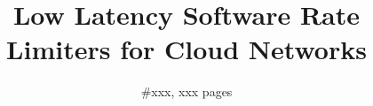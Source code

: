 \documentclass{apnet17}
\begin{document}
\def\draft{1}

\newcommand{\note}[1]{\textcolor{red}{[note: #1]}}
\ifdefined\draft
\newcommand{\mylabel}[1]{\textcolor{blue}{LABEL: #1}}
\newcommand{\wenfei}[1]{\textcolor{red}{[Wenfei: #1]}}
\newcommand{\keqhe}[1]{\textcolor{blue}{[keqhe: #1]}}
\else
\newcommand{\mylabel}[1]{}
\newcommand{\wenfei}[1]{}
\newcommand{\keqhe}[1]{}
\fi

\newcommand{\name}{$C^3$\xspace}
\newcommand{\dem}{DEM\xspace}
\newcommand{\spring}{SPRING\xspace}
\newcommand{\nameone}{DEM\xspace}
\newcommand{\nametwo}{SPRING\xspace}
\newcommand{\tightparagraph}[1]{\vspace{5pt}\noindent\textbf{#1}\ }
\newcommand{\cmark}{\ding{51}}%
\newcommand{\xmark}{\ding{55}}%

 {}
\date{}


\title{Low Latency Software Rate Limiters for Cloud Networks}
\author{\#xxx, xxx pages}

\maketitle








%

%


%
%




\label{last-page}
\end{document}
